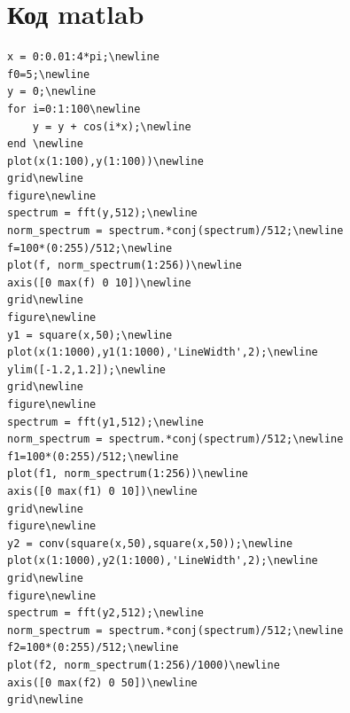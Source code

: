 \documentclass[10pt,a4paper]{report}
\begin{document}
\section{Код matlab}
\begin{verbatim}
x = 0:0.01:4*pi;\newline
f0=5;\newline
y = 0;\newline
for i=0:1:100\newline
    y = y + cos(i*x);\newline
end \newline
plot(x(1:100),y(1:100))\newline
grid\newline
figure\newline
spectrum = fft(y,512);\newline
norm_spectrum = spectrum.*conj(spectrum)/512;\newline
f=100*(0:255)/512;\newline
plot(f, norm_spectrum(1:256))\newline
axis([0 max(f) 0 10])\newline
grid\newline
figure\newline
y1 = square(x,50);\newline
plot(x(1:1000),y1(1:1000),'LineWidth',2);\newline
ylim([-1.2,1.2]);\newline
grid\newline
figure\newline
spectrum = fft(y1,512);\newline
norm_spectrum = spectrum.*conj(spectrum)/512;\newline
f1=100*(0:255)/512;\newline
plot(f1, norm_spectrum(1:256))\newline
axis([0 max(f1) 0 10])\newline
grid\newline
figure\newline
y2 = conv(square(x,50),square(x,50));\newline
plot(x(1:1000),y2(1:1000),'LineWidth',2);\newline
grid\newline
figure\newline
spectrum = fft(y2,512);\newline
norm_spectrum = spectrum.*conj(spectrum)/512;\newline
f2=100*(0:255)/512;\newline
plot(f2, norm_spectrum(1:256)/1000)\newline
axis([0 max(f2) 0 50])\newline
grid\newline
\end{verbatim}
\end{document}
